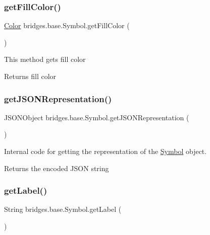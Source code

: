 \subsubsection{\texorpdfstring{get\+Fill\+Color()}{getFillColor()}}
{\footnotesize\ttfamily \hyperlink{classbridges_1_1base_1_1_color}{Color} bridges.\+base.\+Symbol.\+get\+Fill\+Color (\begin{DoxyParamCaption}{ }\end{DoxyParamCaption})}

This method gets fill color

\begin{DoxyReturn}{Returns}
fill color 
\end{DoxyReturn}
\mbox{\label{classbridges_1_1base_1_1_symbol_aeba4cfa5b39fe03e72a568a8b7452e60}} 
\subsubsection{\texorpdfstring{get\+J\+S\+O\+N\+Representation()}{getJSONRepresentation()}}
{\footnotesize\ttfamily J\+S\+O\+N\+Object bridges.\+base.\+Symbol.\+get\+J\+S\+O\+N\+Representation (\begin{DoxyParamCaption}{ }\end{DoxyParamCaption})}

Internal code for getting the representation of the \hyperlink{classbridges_1_1base_1_1_symbol}{Symbol} object.

\begin{DoxyReturn}{Returns}
the encoded J\+S\+ON string 
\end{DoxyReturn}
\mbox{\label{classbridges_1_1base_1_1_symbol_a7616c25b288a6e464f4f0b5fe4bd2826}} 
\subsubsection{\texorpdfstring{get\+Label()}{getLabel()}}
{\footnotesize\ttfamily String bridges.\+base.\+Symbol.\+get\+Label (\begin{DoxyParamCaption}{ }\end{DoxyParamCaption})}

